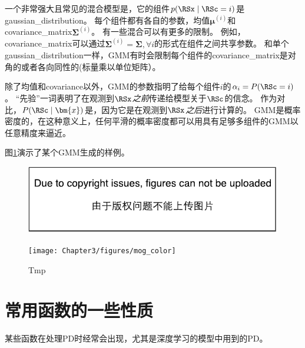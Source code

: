 一个非常强大且常见的混合模型是，它的组件$p(\RSx \mid \RSc= i)$是\gls{gaussian_distribution}。
每个组件都有各自的参数，均值$\bm{\mu}^{(i)}$和\gls{covariance_matrix}$\bm{\Sigma}^{(i)}$。
有一些混合可以有更多的限制。
例如，\gls{covariance_matrix}可以通过$\bm{\Sigma}^{(i)} = \bm{\Sigma}, \forall i$的形式在组件之间共享参数。
和单个\gls{gaussian_distribution}一样，\gls{GMM}有时会限制每个组件的\gls{covariance_matrix}是对角的或者各向同性的(标量乘以单位矩阵）。

除了均值和\gls{covariance}以外，\gls{GMM}的参数指明了给每个组件$i$的$\alpha_i = P(\RSc = i)$。
``先验''一词表明了在观测到$\RSx$\emph{之前}传递给模型关于$\RSc$的信念。
作为对比，$P(\RSc \mid \bm{x})$是，因为它是在观测到$\RSx$\emph{之后}进行计算的。
\gls{GMM}是概率密度的，在这种意义上，任何平滑的概率密度都可以用具有足够多组件的\gls{GMM}以任意精度来逼近。

图\ref{fig:chap3_mog_color}演示了某个\gls{GMM}生成的样例。
\begin{figure}[!htb]
\ifOpenSource
\centerline{\includegraphics{figure.pdf}}
\else
\centerline{\texttt{[image: Chapter3/figures/mog\_color]}}
\fi
\caption{Tmp}
\label{fig:chap3_mog_color}
\end{figure}


\section{常用函数的一些性质}
\label{sec:useful_properties_of_common_functions}

某些函数在处理\gls{PD}时经常会出现，尤其是深度学习的模型中用到的\gls{PD}。


